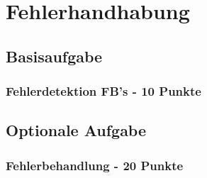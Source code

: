 \section{Fehlerhandhabung} \label{cpt:Fehlerbehandlung}

\subsection{Basisaufgabe}

\subsubsection{Fehlerdetektion FB's - 10 Punkte}

\subsection{Optionale Aufgabe}

\subsubsection{Fehlerbehandlung - 20 Punkte}


\newpage
